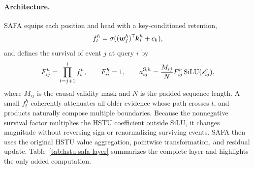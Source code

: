 \documentclass[11pt,letterpaper,logo]{yalearxiv}
\begin{document}
\paragraph{Architecture.}
SAFA equips each position and head with a key-conditioned retention,
\begin{equation}
  f_t^h=\sigma((\boldsymbol{w}_f^h)^{\mathsf{T}}\boldsymbol{k}_t^h+c_h),
  \label{eq:forget-gate}
\end{equation}
and defines the survival of event $j$ at query $i$ by
\begin{equation}
  F_{ij}^h=\prod_{t=j+1}^{i}f_t^h,\qquad F_{ii}^h=1,
  \qquad
  a_{ij}^{\mathrm S,h}
  =\frac{M_{ij}}{N}F_{ij}^h\operatorname{SiLU}(s_{ij}^h),
  \label{eq:safa-layer}
\end{equation}
where $M_{ij}$ is the causal validity mask and $N$ is the padded sequence
length.  A small $f_t^h$ coherently attenuates all older evidence whose path
crosses $t$, and products naturally compose multiple boundaries.  Because the
nonnegative survival factor multiplies the HSTU coefficient outside SiLU, it
changes magnitude without reversing sign or renormalizing surviving events.
SAFA then uses the original HSTU value aggregation, pointwise transformation,
and residual update.  Table~\ref{tab:hstu-safa-layer} summarizes the complete
layer and highlights the only added computation.
\end{document}
